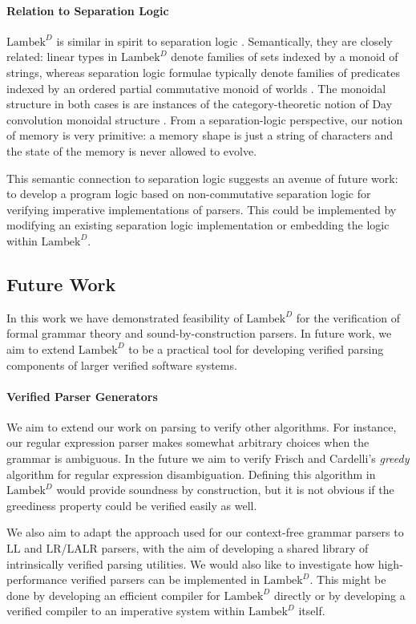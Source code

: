 \documentclass[acmsmall,nonacm]{acmart}
\newcommand{\theoryabbv}{$\textrm{Lambek}^D$\xspace}
\newcommand{\LLL}{\textrm{LL}}
\newcommand{\LRR}{\textrm{LR}}
\newcommand{\LALRR}{\textrm{LALR}}
\begin{document}
{\paragraph{Relation to Separation Logic}

\theoryabbv is similar in spirit to separation logic
\cite{reynolds_separation_2002}. Semantically, they are closely
related: linear types in \theoryabbv denote families of sets indexed
by a monoid of strings, whereas separation logic formulae typically
denote families of predicates indexed by an ordered partial
commutative monoid of worlds \cite{jung_higher-order_2016}. The
monoidal structure in both cases is are instances of the
category-theoretic notion of Day convolution monoidal structure
\cite{day1970construction}. From a separation-logic perspective, our
notion of memory is very primitive: a memory shape is just a string of
characters and the state of the memory is never allowed to evolve.

This semantic connection to separation logic suggests an avenue of
future work: to develop a program logic based on non-commutative
separation logic for verifying imperative implementations of
parsers. This could be implemented by modifying an existing separation
logic implementation or embedding the logic within \theoryabbv.

\subsection{Future Work}
In this work we have demonstrated feasibility of \theoryabbv for the
verification of formal grammar theory and sound-by-construction parsers. In
future work, we aim to extend \theoryabbv to be a practical tool for developing
verified parsing components of larger verified software systems.

\paragraph{Verified Parser Generators}
We aim to extend our work on parsing to verify other algorithms. For instance,
our regular expression parser makes somewhat arbitrary choices
when the grammar is ambiguous. In the future we aim to verify Frisch and
Cardelli's \emph{greedy} algorithm for regular expression
disambiguation. Defining this algorithm in \theoryabbv would provide soundness
by construction, but it is not obvious if the greediness property could be
verified easily as well.

We also aim to adapt the approach used for our context-free grammar parsers to
$\LLL$ and $\LRR$/$\LALRR$ parsers, with the aim of developing a shared library
of intrinsically verified parsing utilities.
We would also like to investigate how high-performance verified parsers
can be implemented in \theoryabbv. This might be done by developing an efficient
compiler for \theoryabbv directly or by developing a verified compiler to an
imperative system within \theoryabbv itself.

}
\end{document}

